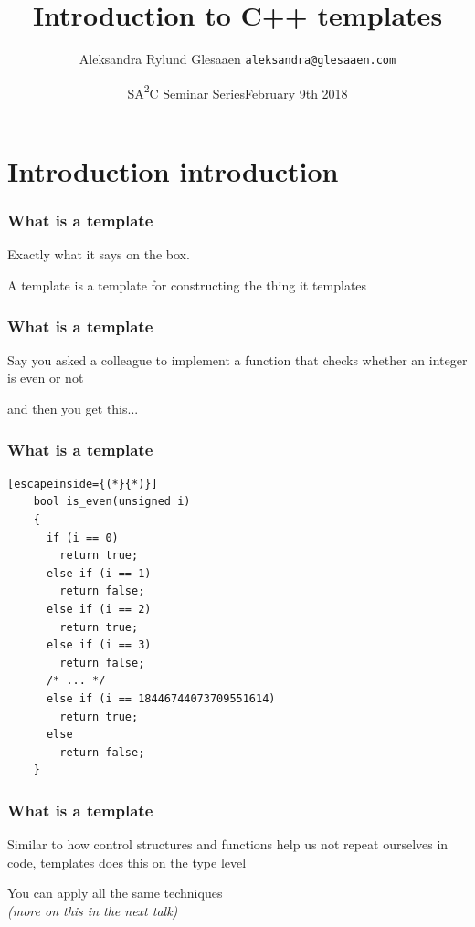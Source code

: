 \documentclass[14pt]{beamer}
\title{Introduction to C++ templates}
\author{\texorpdfstring{%
    Aleksandra Rylund Glesaaen\newline%
    \fontsize{12pt}{12pt}\selectfont\texttt{aleksandra@glesaaen.com}%
  }{%
    Aleksandra Rylund Glesaaen}}
\date{\texorpdfstring{%
    SA{\color{SAACOrange}\textsuperscript{2}}C Seminar Series\newline{}February 9th 2018%
  }{%
    February 9th 2018}}
\begin{document}
\nocite{*}

\frame{\titlepage}

\section{Introduction introduction}
\frame{\sectionpage}

\begin{frame}[fragile]
  \frametitle{What is a template}

  \begin{minipage}{0.8\textwidth}
    Exactly what it says on the box.

    \vspace{1cm}
    A template is a template for constructing the thing it templates
  \end{minipage}

\end{frame}

\begin{frame}[fragile]
  \frametitle{What is a template}

  \begin{minipage}{0.8\textwidth}
    Say you asked a colleague to implement a function that checks whether an
    integer is even or not
  
    \vspace{1.5cm}
  
    and then you get this...
  \end{minipage}

\end{frame}

\begin{frame}[fragile]
  \frametitle{What is a template}

  \begin{lstlisting}[escapeinside={(*}{*)}]
    bool is_even(unsigned i)
    {
      if (i == 0)
        return true;
      else if (i == 1)
        return false;
      else if (i == 2)
        return true;
      else if (i == 3)
        return false;
      /* ... */
      else if (i == 18446744073709551614)
        return true;
      else
        return false;
    }
  \end{lstlisting}

\end{frame}

\begin{frame}[fragile]
  \frametitle{What is a template}

  Similar to how control structures and functions help us not repeat ourselves
  in code, templates does this on the type level

  \vspace{.75cm}

  You can apply all the same techniques \\
  {\itshape\changefontsize{10pt}(more on this in the next talk)}

\end{frame}
\end{document}
